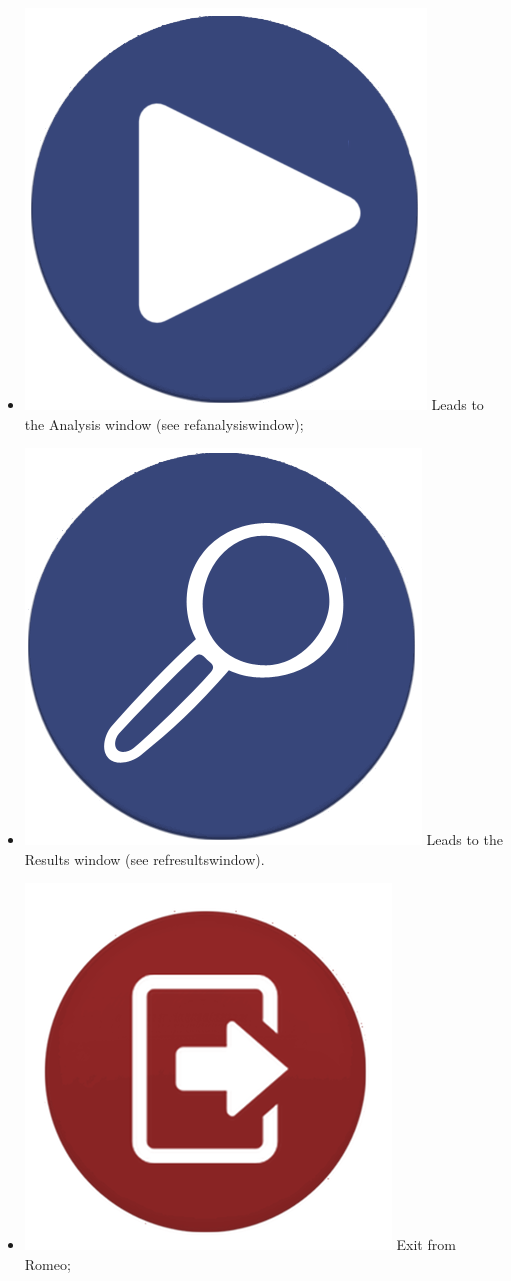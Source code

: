 \begin{itemize}
\item \includegraphics[scale=0.07]{./Images/start_Analysis} Leads to the Analysis window (see ref{analysiswindow});
\item \includegraphics[scale=0.07]{./Images/show_Results} Leads to the Results window (see ref{resultswindow}).
\item \includegraphics[scale=0.085]{./Images/exit} Exit from Romeo;
\end{itemize}
